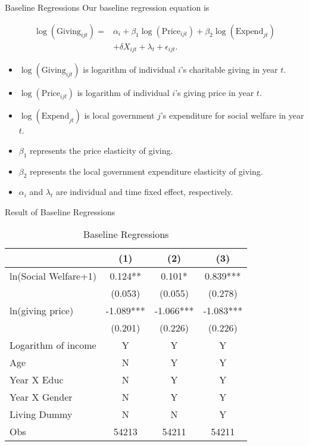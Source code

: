 \documentclass[
  ignorenonframetext,
]{beamer}
\providecommand{\tightlist}{%
  \setlength{\itemsep}{0pt}\setlength{\parskip}{0pt}}
\begin{document}
\begin{frame}{Baseline Regressions}
\protect\hypertarget{baseline-regressions}{}
Our baseline regression equation is

\begin{align*}
    \log(\text{Giving}_{ijt}) = 
    &\alpha_i + \beta_1 \log(\text{Price}_{ijt}) + \beta_2 \log(\text{Expend}_{jt}) \\
    &+ \delta X_{ijt} + \lambda_t + \epsilon_{ijt}.
\end{align*}

\begin{itemize}
\tightlist
\item
  \(\log(\text{Giving}_{ijt})\) is logarithm of individual \(i\)'s
  charitable giving in year \(t\).
\item
  \(\log(\text{Price}_{ijt})\) is logarithm of individual \(i\)'s giving
  price in year \(t\).
\item
  \(\log(\text{Expend}_{jt})\) is local government \(j\)'s expenditure
  for social welfare in year \(t\).
\item
  \(\beta_1\) represents the price elasticity of giving.
\item
  \(\beta_2\) represents the local government expenditure elasticity of
  giving.
\item
  \(\alpha_i\) and \(\lambda_t\) are individual and time fixed effect,
  respectively.
\end{itemize}
\end{frame}

\begin{frame}{Result of Baseline Regressions}
\protect\hypertarget{result-of-baseline-regressions}{}
\begin{table}

\caption{\label{tab:kableTabBaseReg}Baseline Regressions}
\centering
\begin{tabular}[t]{lccc}
\toprule
 & (1) & (2) & (3)\\
\midrule
ln(Social Welfare+1) & 0.124** & 0.101* & 0.839***\\
 & (0.053) & (0.055) & (0.278)\\
ln(giving price) & -1.089*** & -1.066*** & -1.083***\\
 & (0.201) & (0.226) & (0.226)\\
Logarithm of income & Y & Y & Y\\
Age & N & Y & Y\\
Year X Educ & N & Y & Y\\
Year X Gender & N & Y & Y\\
Living Dummy & N & N & Y\\
Obs & 54213 & 54211 & 54211\\
\bottomrule
\end{tabular}
\end{table}
\end{frame}
\end{document}
